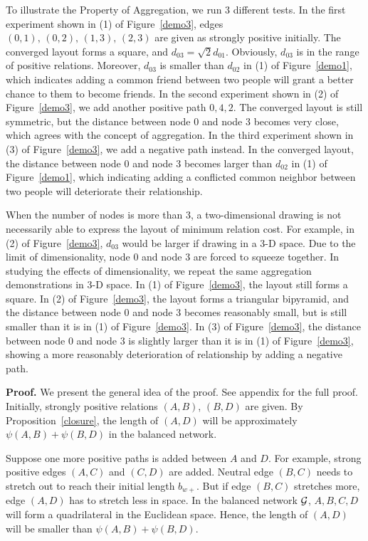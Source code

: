 To illustrate the Property of Aggregation, we run $3$ different tests. In the first experiment shown in (1) of Figure~\ref{demo3}, edges $(0,1),\,(0,2),\,(1,3),\,(2,3)$ are given as strongly positive initially.  The converged layout forms a square, and $d_{03}=\sqrt{2}{d_{01}}$. Obviously, $d_{03}$ is in the range of positive relations. Moreover, $d_{03}$ is smaller than $d_{02}$ in (1) of Figure~\ref{demo1}, which indicates adding a common friend between two people will grant a better chance to them to become friends. In the second experiment shown in (2) of Figure~\ref{demo3}, we add another positive path ${0,4,2}$. The converged layout is still symmetric, but the distance between node $0$ and node $3$ becomes very close, which agrees with the concept of aggregation. In the third experiment shown in (3) of Figure~\ref{demo3}, we add a negative path instead. In the converged layout, the distance between node $0$ and node $3$ becomes larger than $d_{02}$ in (1) of Figure~\ref{demo1}, which indicating adding a conflicted common neighbor between two people will deteriorate their relationship.

When the number of nodes is more than $3$, a two-dimensional drawing is not necessarily able to express the layout of minimum relation cost. For example, in (2) of Figure~\ref{demo3}, $d_{03}$ would be larger if drawing in a 3-D space. Due to the limit of dimensionality, node $0$ and node $3$ are forced to squeeze together. In studying the effects of dimensionality, we repeat the same aggregation demonstrations in 3-D space. In (1) of Figure~\ref{demo3}, the layout still forms a square. In (2) of Figure~\ref{demo3}, the layout forms a  triangular bipyramid, and the distance between node $0$ and node $3$ becomes reasonably small, but is still smaller than it is in (1) of Figure~\ref{demo3}. In (3) of Figure~\ref{demo3}, the distance between node $0$ and node $3$ is slightly larger than it is in (1) of Figure~\ref{demo3}, showing a more reasonably deterioration of relationship by adding a negative path.

{\bf Proof. } We present the general idea of the proof. See appendix for the full proof. 
Initially, strongly positive relations $(A, B)$, $(B, D)$ are given. By Proposition~\ref{closure}, the length of $(A,D)$ will be approximately $\psi(A,B)+\psi(B,D)$ in the balanced network.

Suppose one more positive paths is added between $A$ and $D$. For example, strong positive edges $(A,C)$ and $(C,D)$ are added. Neutral edge $(B,C)$ needs to stretch out to reach their initial length $b_{w+}$. But if edge $(B,C)$ stretches more, edge $(A,D)$ has to stretch less in space. In the balanced network $\cal G$, $A,B,C,D$ will form a quadrilateral in the Euclidean space. Hence, the length of $(A,D)$ will be smaller than $\psi(A,B)+\psi(B,D)$.


